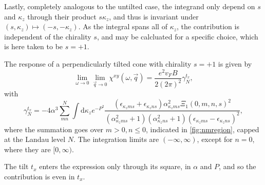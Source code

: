 Lastly, completely analogous to the untilted case, the integrand only depend on \( s \) and \( \kappa_z \) through their product \( s \kappa_z \), and thus is invariant under \( (s, \kappa_z) \mapsto (-s, -\kappa_z) \).
As the integral spans all of \( \kappa_z \), the contribution is independent of the chirality \( s \), and may be calcluated for a specific choice, which is here taken to be \( s=+1 \).

\begin{summary}
  The response of a perpendicularly tilted cone with chirality \( s=+1 \) is given by
  \begin{equation}
    \label{eq:118}
    \lim_{\omega \to 0} \lim_{\vec{q} \to 0} \chi^{xy}(\omega, \vec{q}) =
    \frac{e^2v_F B }{2 (2 \pi)^2 }
    \gamma^{t_x}_N,
  \end{equation}
  with
  \begin{equation}
    \label{eq:119}
    \gamma^{t_x}_N =
    -4 \alpha^3
    \sum\limits_{mn}^{N}
    \int \mathrm{d}\kappa_z
    e^{-P^2}
    \frac{
      (\epsilon_{\kappa_z m s} + \epsilon_{\kappa_z n s})
      \alpha_{\kappa_z m s}^2 \Xi_1(0, m,n, s)^2
    }{
      (\alpha_{\kappa_z m s}^2 + 1)(\alpha_{\kappa_z n s}^2 + 1)
      (\epsilon_{\kappa_z m s} - \epsilon_{\kappa_z ns})^2
    },
  \end{equation}
  where the summation goes over \( m > 0, n \leq 0 \), indicated in \cref{fig:nmregion}, capped at the Landau level \( N \).
  The integration limits are \( (-\infty, \infty) \), except for \( n = 0 \), where they are \( [0, \infty) \).

  The tilt \( t_x \) enters the expression only through its square, in \( \alpha \) and \( P \), and so the contribution is even in \( t_x \).
\end{summary}


